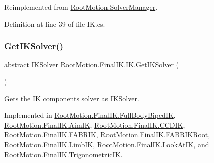 Reimplemented from \mbox{\hyperlink{class_root_motion_1_1_solver_manager_addb54e92acd91364a9205c5807a42776}{Root\+Motion.\+Solver\+Manager}}.



Definition at line 39 of file I\+K.\+cs.

\mbox{\label{class_root_motion_1_1_final_i_k_1_1_i_k_ad9ef393e69cd16ba2d6fa06ba06b7a66}} 
\subsubsection{\texorpdfstring{Get\+I\+K\+Solver()}{GetIKSolver()}}
{\footnotesize\ttfamily abstract \mbox{\hyperlink{class_root_motion_1_1_final_i_k_1_1_i_k_solver}{I\+K\+Solver}} Root\+Motion.\+Final\+I\+K.\+I\+K.\+Get\+I\+K\+Solver (\begin{DoxyParamCaption}{ }\end{DoxyParamCaption})\hspace{0.3cm}{\ttfamily [pure virtual]}}



Gets the IK component\textquotesingle{}s solver as \mbox{\hyperlink{class_root_motion_1_1_final_i_k_1_1_i_k_solver}{I\+K\+Solver}}. 



Implemented in \mbox{\hyperlink{class_root_motion_1_1_final_i_k_1_1_full_body_biped_i_k_a40afaf3c61effbcc2ee82ad30c0b4bb7}{Root\+Motion.\+Final\+I\+K.\+Full\+Body\+Biped\+IK}}, \mbox{\hyperlink{class_root_motion_1_1_final_i_k_1_1_aim_i_k_a32e4e1392cf1b39a33e5bb2c8022f941}{Root\+Motion.\+Final\+I\+K.\+Aim\+IK}}, \mbox{\hyperlink{class_root_motion_1_1_final_i_k_1_1_c_c_d_i_k_a0bed91571fde99f94e6cec73ca6db310}{Root\+Motion.\+Final\+I\+K.\+C\+C\+D\+IK}}, \mbox{\hyperlink{class_root_motion_1_1_final_i_k_1_1_f_a_b_r_i_k_a981c902f3f99de1bc37988fbd2226ce7}{Root\+Motion.\+Final\+I\+K.\+F\+A\+B\+R\+IK}}, \mbox{\hyperlink{class_root_motion_1_1_final_i_k_1_1_f_a_b_r_i_k_root_a3bc8f9e7db9f8eafb22c95530f2a9f7c}{Root\+Motion.\+Final\+I\+K.\+F\+A\+B\+R\+I\+K\+Root}}, \mbox{\hyperlink{class_root_motion_1_1_final_i_k_1_1_limb_i_k_ad5769cba3e3e93e1872e59138e594e2c}{Root\+Motion.\+Final\+I\+K.\+Limb\+IK}}, \mbox{\hyperlink{class_root_motion_1_1_final_i_k_1_1_look_at_i_k_a9a328d936ed493a056797c85b5e8f9dd}{Root\+Motion.\+Final\+I\+K.\+Look\+At\+IK}}, and \mbox{\hyperlink{class_root_motion_1_1_final_i_k_1_1_trigonometric_i_k_a0f03fc1647caa39a0d3ca07865936df8}{Root\+Motion.\+Final\+I\+K.\+Trigonometric\+IK}}.

